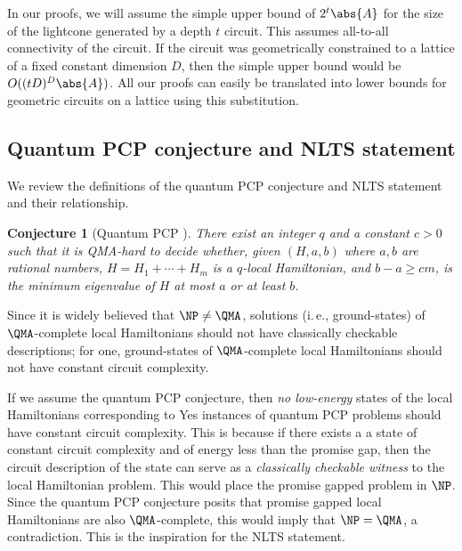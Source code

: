 \documentclass[11pt]{article}
\newtheorem{conjecture}[theorem]{Conjecture}
\newcommand{\ie}{i.\,e.}
\begin{document}
In our proofs, we will assume the simple upper bound of $2^t \abs{A}$ for the size of the lightcone generated by a depth $t$ circuit. This assumes all-to-all connectivity of the circuit. If the circuit was geometrically constrained to a lattice of a fixed constant dimension $D$, then the simple upper bound would be $O((tD )^D \abs{A})$. All our proofs can easily be translated into lower bounds for geometric circuits on a lattice using this substitution.


\subsection{Quantum PCP conjecture and NLTS statement}

We review the definitions of the quantum PCP conjecture and NLTS statement and their relationship.

%
%
%
%
%
%

\begin{conjecture}[Quantum PCP \cite{quant-ph/0210077,10.1145/2491533.2491549}]
There exist an integer $q$ and a constant $c > 0$ such that it is QMA-hard to decide
whether, given $(H,a,b)$ where $a,b$ are rational numbers,
$H = H_1 + \cdots + H_m$ is a $q$-local Hamiltonian, and $b-a\ge cm$,
is the minimum eigenvalue of $H$ at most $a$ or at least $b$.
\end{conjecture}

%
%
%
%
%

Since %
it is widely believed that $\NP \neq \QMA$, solutions (\ie, ground-states) of $\QMA$-complete local Hamiltonians should not have classically checkable descriptions; for one, ground-states of $\QMA$-complete local Hamiltonians should not have constant circuit complexity. 

If we assume the quantum PCP conjecture, then
%
%
%
%
\emph{no low-energy} states of the local Hamiltonians corresponding to Yes instances of quantum
PCP problems should have constant circuit complexity.  %
%
This is because if there exists a %
%
a state of constant circuit complexity and  %
of energy less than the promise gap, then the circuit description of the state can serve as a \emph{classically checkable witness} to the local Hamiltonian problem. This would place the promise gapped problem in $\NP$. Since the quantum PCP conjecture posits that promise gapped local Hamiltonians are also $\QMA$-complete, this would imply that $\NP = \QMA$, a contradiction. This is the inspiration for the NLTS statement.
\end{document}
